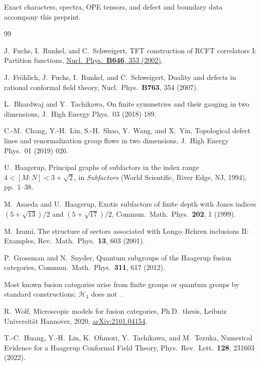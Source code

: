 \documentclass[aps,prl,twocolumn,superscriptaddress,nofootinbib]{revtex4-2}
\newcommand{\cH}{\mathcal H}
\begin{document}
Exact characters, spectra, OPE tensors, and defect and boundary data
accompany this preprint.

\begin{acknowledgments}
[To be added.]
\end{acknowledgments}

\begin{thebibliography}{99}

J.~Fuchs, I.~Runkel, and C.~Schweigert,
TFT construction of RCFT correlators I: Partition functions,
\href{https://doi.org/10.1016/S0550-3213(02)00744-7}{Nucl.\ Phys.\ \textbf{B646}, 353 (2002)}.

J.~Fr\"ohlich, J.~Fuchs, I.~Runkel, and C.~Schweigert,
Duality and defects in rational conformal field theory,
Nucl.\ Phys.\ \textbf{B763}, 354 (2007).

L.~Bhardwaj and Y.~Tachikawa,
On finite symmetries and their gauging in two dimensions,
J.\ High Energy Phys.\ 03 (2018) 189.

C.-M.~Chang, Y.-H.~Lin, S.-H.~Shao, Y.~Wang, and X.~Yin,
Topological defect lines and renormalization group flows in two
dimensions,
J.\ High Energy Phys.\ 01 (2019) 026.

U.~Haagerup,
Principal graphs of subfactors in the index range
$4<[M{:}N]<3+\sqrt2$,
in \textit{Subfactors} (World Scientific, River Edge, NJ, 1994),
pp.~1--38.

M.~Asaeda and U.~Haagerup,
Exotic subfactors of finite depth with Jones indices $(5+\sqrt{13})/2$
and $(5+\sqrt{17})/2$,
Commun.\ Math.\ Phys.\ \textbf{202}, 1 (1999).

M.~Izumi,
The structure of sectors associated with Longo--Rehren inclusions II:
Examples,
Rev.\ Math.\ Phys.\ \textbf{13}, 603 (2001).

P.~Grossman and N.~Snyder,
Quantum subgroups of the Haagerup fusion categories,
Commun.\ Math.\ Phys.\ \textbf{311}, 617 (2012).

Most known fusion categories arise from finite groups or quantum
groups by standard constructions; $\cH_3$ does not~\cite{HLOTT}.

R.~Wolf,
Microscopic models for fusion categories,
Ph.D.\ thesis, Leibniz Universit\"at Hannover, 2020,
\href{https://arxiv.org/abs/2101.04154}{arXiv:2101.04154}.

T.-C.~Huang, Y.-H.~Lin, K.~Ohmori, Y.~Tachikawa, and M.~Tezuka,
Numerical Evidence for a Haagerup Conformal Field Theory,
Phys.\ Rev.\ Lett.\ \textbf{128}, 231603 (2022).


\end{thebibliography}
\end{document}
